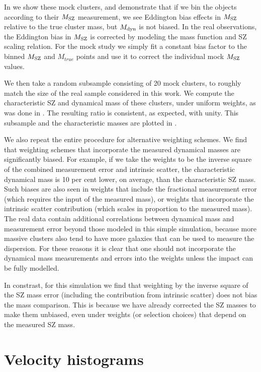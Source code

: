In  we show these mock clusters, and demonstrate that if we bin the objects according to their $M_{\rm SZ}$ measurement, we see Eddington bias effects in $M_{\rm SZ}$ relative to the true cluster mass, but $M_{\rm dyn}$ is not biased.  In the real observations, the Eddington bias in $M_{\rm SZ}$ is corrected by modeling the mass function and SZ scaling relation.  For the mock study we simply fit a constant bias factor to the binned $M_{\rm SZ}$ and $M_{true}$ points and use it to correct the individual mock $M_{\rm SZ}$ values.

We then take a random subsample consisting of 20 mock clusters, to roughly match the size of the real sample considered in this work.  We compute the characteristic SZ and dynamical mass of these clusters, under uniform weights, as was done in .  The resulting ratio is consistent, as expected, with unity.  This subsample and the characteristic masses are plotted in .

We also repeat the entire procedure for alternative weighting schemes. We find that weighting 
schemes that incorporate the measured dynamical masses are significantly biased. For example, if 
we take the weights to be the inverse square of the combined measurement error and intrinsic 
scatter, the characteristic dynamical mass is 10 per cent lower, on average, than the 
characteristic SZ mass. Such biases are also seen in weights that include the fractional 
measurement error (which requires the input of the measured mass), or weights that incorporate the 
intrinsic scatter contribution (which scales in proportion to the measured mass). The real data 
contain additional correlations between dynamical mass and measurement error beyond those modeled 
in this simple simulation, because more massive clusters also tend to have more galaxies that can 
be used to measure the dispersion.  For these reasons it is clear that one should not incorporate 
the dynamical mass measurements and errors into the weights unless the impact can be fully 
modelled.

In constrast, for this simulation we find that weighting by the inverse square of the SZ mass 
error (including the contribution from intrinsic scatter) does not bias the mass comparison. This 
is because we have already corrected the SZ masses to make them unbiased, even under weights (or 
selection choices) that depend on the measured SZ mass.


\section{Velocity histograms}

